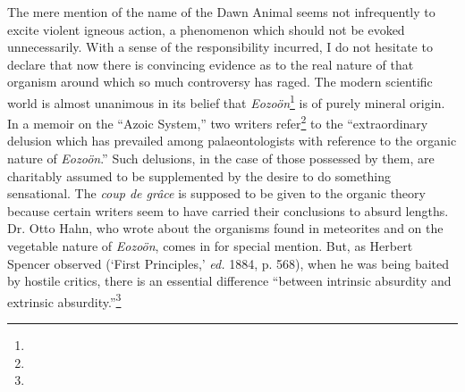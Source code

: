 \documentclass[a4paper, 12pt, oneside]{article}
\begin{document}
The mere mention of the name of the Dawn Animal seems not infrequently to excite violent igneous action, a phenomenon which should not be evoked unnecessarily. With a sense of the responsibility incurred, I do not hesitate to declare that now there is convincing evidence as to the real nature of that organism around which so much controversy has raged. The modern scientific world is almost unanimous in its belief that \emph{Eozoön}\footnote{} is of purely mineral origin. In a memoir on the ``Azoic System,'' two writers refer\footnote{} to the ``extraordinary delusion which has prevailed among palaeontologists with reference to the organic nature of \emph{Eozoön}.'' Such delusions, in the case of those possessed by them, are charitably assumed to be supplemented by the desire to do something sensational. The \emph{coup de grâce} is supposed to be given to the organic theory because certain writers seem to have carried their conclusions to absurd lengths. Dr. Otto Hahn, who wrote about the organisms found in meteorites and on the vegetable nature of \emph{Eozoön}, comes in for special mention. But, as Herbert Spencer observed (`First Principles,' \emph{ed.} 1884, p. 568), when he was being baited by hostile critics, there is an essential difference ``between intrinsic absurdity and extrinsic absurdity.''\footnote{}
\end{document}
